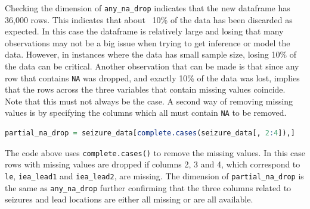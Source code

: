 Checking the dimension of \verb|any_na_drop| indicates that the new dataframe has 36,000 rows. This indicates that about ~10\% of the data has been discarded as expected. In this case the dataframe is relatively large and losing that many observations may not be a big issue when trying to get inference or model the data. However, in instances where the data has small sample size, losing 10\% of the data can be critical. Another observation that can be made is that since any row that contains \verb|NA| was dropped, and exactly 10\% of the data was lost, implies that the rows across the three variables that contain missing values coincide. Note that this must not always be the case.
A second way of removing missing values is by specifying the columns which all must contain \verb|NA| to be removed.
\begin{lstlisting}[language=R]
partial_na_drop = seizure_data[complete.cases(seizure_data[, 2:4]),]
\end{lstlisting}
The code above uses \verb|complete.cases()| to remove the missing values. In this case rows with missing values are dropped if columns 2, 3 and 4, which correspond to \verb|le|, \verb|iea_lead1| and \verb|iea_lead2|, are missing. The dimension of \verb|partial_na_drop| is the same as \verb|any_na_drop| further confirming that the three columns related to seizures and lead locations are either all missing or are all available.

